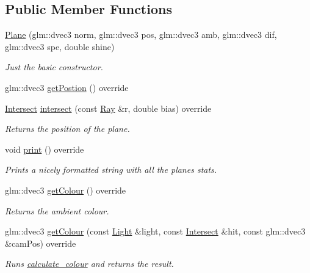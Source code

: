 \subsection*{Public Member Functions}
\begin{DoxyCompactItemize}
\item 
\mbox{\hyperlink{class_plane_aeb002db84ff90de81df472544c35dbca}{Plane}} (glm\+::dvec3 norm, glm\+::dvec3 pos, glm\+::dvec3 amb, glm\+::dvec3 dif, glm\+::dvec3 spe, double shine)
\begin{DoxyCompactList}\small\item\em Just the basic constructor. \end{DoxyCompactList}\item 
glm\+::dvec3 \mbox{\hyperlink{class_plane_ab49db9185e5489809dc13135a5231109}{get\+Postion}} () override
\item 
\mbox{\hyperlink{struct_intersect}{Intersect}} \mbox{\hyperlink{class_plane_ab636b2a91165088ba60dac02aaf89785}{intersect}} (const \mbox{\hyperlink{struct_ray}{Ray}} \&r, double bias) override
\begin{DoxyCompactList}\small\item\em Returns the position of the plane. \end{DoxyCompactList}\item 
void \mbox{\hyperlink{class_plane_a3d9139793b931279e3dcd1fd80a263c7}{print}} () override
\begin{DoxyCompactList}\small\item\em Prints a nicely formatted string with all the plane\textquotesingle{}s stats. \end{DoxyCompactList}\item 
glm\+::dvec3 \mbox{\hyperlink{class_plane_acd86caefd4ff1bf35f2719b1bef6afd8}{get\+Colour}} () override
\begin{DoxyCompactList}\small\item\em Returns the ambient colour. \end{DoxyCompactList}\item 
glm\+::dvec3 \mbox{\hyperlink{class_plane_a05e58028f795833a1ee68b374597fa3a}{get\+Colour}} (const \mbox{\hyperlink{class_light}{Light}} \&light, const \mbox{\hyperlink{struct_intersect}{Intersect}} \&hit, const glm\+::dvec3 \&cam\+Pos) override
\begin{DoxyCompactList}\small\item\em Runs \mbox{\hyperlink{util_8h_add552e26ff1418c78cbcb09b18ab0f44}{calculate\+\_\+colour}} and returns the result. \end{DoxyCompactList}\end{DoxyCompactItemize}


